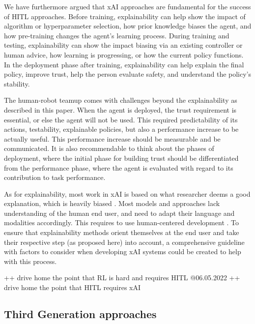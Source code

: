 \documentclass[twoside,11pt]{article}
\begin{document}
We have furthermore argued that xAI approaches are fundamental for the success of HITL approaches. Before training, explainability can help show the impact of algorithm or hyperparameter selection, how prior knowledge biases the agent, and how pre-training changes the agent's learning process. During training and testing, explainability can show the impact biasing via an existing controller or human advice, how learning is progressing, or how the current policy functions. In the deployment phase after training, explainability can help explain the final policy, improve trust, help the person evaluate safety, and understand the policy's stability.


The human-robot teamup comes with challenges beyond the explainability as described in this paper. When the agent is deployed, the trust requirement is essential, or else the agent will not be used. This required predictability of its actions, testability, explainable policies, but also a performance increase to be actually useful. This performance increase should be measurable and be communicated. It is also recommendable to think about the phases of deployment, where the initial phase for building trust should be differentiated from the performance phase, where the agent is evaluated with regard to its contribution to task performance. 


As for explainability, most work in xAI is based on what researcher deems a good explanation, which is heavily biased \cite{Miller:2019:xAISocialSciencesInsights}. Most models and approaches lack understanding of the human end user, and need to adapt their language and modalities accordingly. This requires to use human-centered development \cite{PuiuttaVeith:2020:xAIRLSurvey}. To ensure that explainability methods orient themselves at the end user and take their respective step (as proposed here) into account, a comprehensive guideline with factors to consider when developing xAI systems could be created to help with this process.



++ drive home the point that RL is hard and requires HITL @06.05.2022
++ drive home the point that HITL requires xAI

\subsection{Third Generation approaches}
\end{document}
